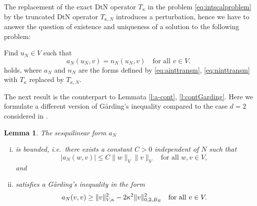 \documentclass[12pt,DIV=14]{scrartcl}
\newtheorem{lemma}[definition]{Lemma}
\let\Re\relax\DeclareMathOperator{\Re}{Re}
\begin{document}
The replacement of the exact DtN operator $T_\kappa$ in the problem \eqref{eq:intscalproblem}
by the truncated DtN operator $T_{\kappa,N}$ introduces a perturbation,
hence we have to answer the question of existence and uniqueness of a solution
to the following problem:

Find $u_N\in V$ such that
\begin{equation}\label{eq:intscalproblem4}
a_N(u_N,v) = n_N(u_N,v)
\quad\text{for all }
v\in V.
\end{equation}
holds, where $a_N$ and $n_N$ are the forms defined by \eqref{eq:ainttransm},
\eqref{eq:ninttransm} with $T_\kappa$ replaced by $T_{\kappa,N}$.

The next result is the counterpart to Lemmata \ref{l:a-cont}, \ref{l:contGarding}.
Here we formulate a different version of G{\aa}rding's inequality compared to the case
$d = 2$ considered in \cite[Thm.~4.4]{Hsiao:11}.
\begin{lemma}\label{l:aNprop}
The sesquilinear form $a_N$
\begin{enumerate}[(i)]
\item
is bounded, i.e.\ there exists a constant $C > 0$ independent of $N$ such that
\[
|a_N(w,v)| \le C\|w\|_V \|v\|_V
\quad\text{for all } w,v\in V,
\]
and
\item
satisfies a G{\aa}rding's inequality in the form
\[
\Re a_N(v,v) \ge \|v\|_{V,\kappa}^2 - 2\kappa^2 \|v\|_{0,2,B_R}^2
\quad\text{for all } v\in V.
\]
\end{enumerate}
\end{lemma}
\end{document}
